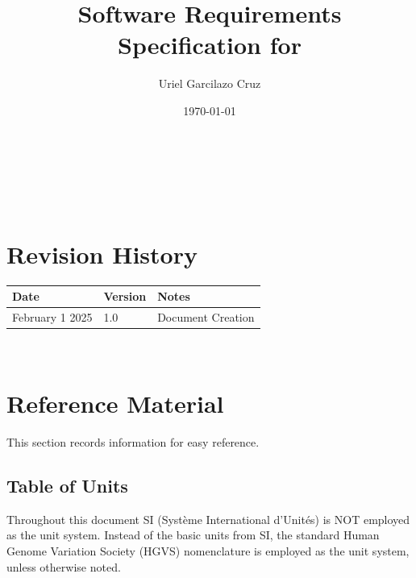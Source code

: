 \documentclass[12pt]{article}
\begin{document}
\title{Software Requirements Specification for \progname} 
\author{Uriel Garcilazo Cruz}
\date{\today}
	
\maketitle

~\newpage


\tableofcontents

~\newpage

\section*{Revision History}

\begin{tabularx}{\textwidth}{p{3cm}p{2cm}X}
\toprule {\bf Date} & {\bf Version} & {\bf Notes}\\
\midrule
February 1 2025 & 1.0 & Document Creation\\
\bottomrule
\end{tabularx}


~\newpage

\section{Reference Material}

This section records information for easy reference.

\subsection{Table of Units}

Throughout this document SI (Syst\`{e}me International d'Unit\'{e}s) is NOT employed
as the unit system.  Instead of the basic units from SI, the standard Human Genome
 Variation Society (HGVS) nomenclature is employed as the unit system, unless 
otherwise noted.
\end{document}
